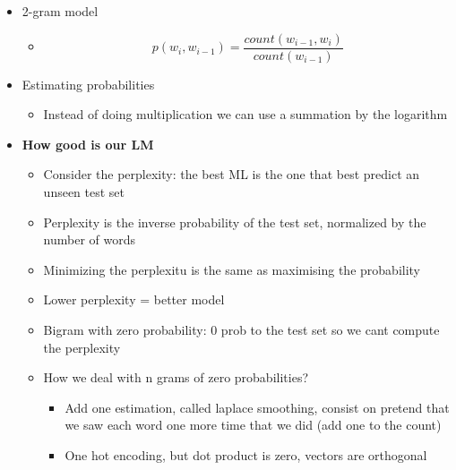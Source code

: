 \begin{itemize}
\begin{itemize}
    \end{itemize}
    \item 2-gram model 
    \begin{itemize}
        \item \[p(w_i, w_{i-1}) = \frac{count(w_{i-1}, w_i)}{count(w_{i-1})}\]
    \end{itemize}
    \item Estimating probabilities
    \begin{itemize}
        \item Instead of doing multiplication we can use a summation by the logarithm
    \end{itemize}
    \item \textbf{How good is our LM}
    \begin{itemize}
        \item Consider the perplexity: the best ML is the one that best predict an unseen test set
        \item Perplexity is the inverse probability of the test set, normalized by the number of words
        \item Minimizing the perplexitu is the same as maximising the probability 
        \item Lower perplexity = better model
        \item Bigram with zero probability: 0 prob to the test set so we cant compute the perplexity
        \item How we deal with n grams of zero probabilities?
        \begin{itemize}
            \item Add one estimation, called laplace smoothing, consist on pretend that we saw each word one more time that we did (add one to the count)
            \item One hot encoding, but dot product is zero, vectors are orthogonal
        \end{itemize}
    \end{itemize}
\end{itemize}



